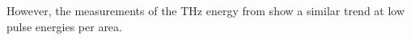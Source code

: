 However, the measurements of the $\si{\tera\hertz}$ energy from \cite{THZ_eltric_field} show a similar trend at low pulse energies per area.
\\
\FloatBarrier
